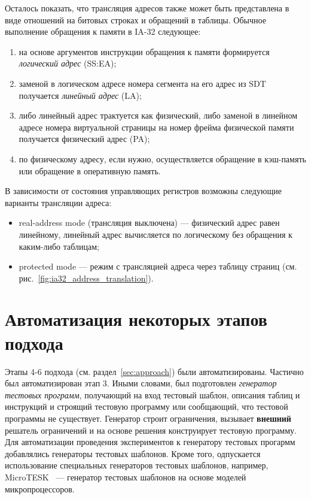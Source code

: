 Осталось показать, что трансляция адресов также может быть представлена в виде
отношений на битовых строках и обращений в таблицы. Обычное выполнение
обращения к памяти в IA-32 следующее:
\begin{enumerate}
    \item на основе аргументов инструкции обращения к памяти формируется \emph{логический адрес} (SS:EA);
    \item заменой в логическом адресе номера сегмента на его адрес из SDT получается \emph{линейный адрес} (LA);
    \item либо линейный адрес трактуется как физический, либо заменой в линейном адресе номера виртуальной страницы на номер фрейма физической памяти получается физический адрес (PA);
    \item по физическому адресу, если нужно, осуществляется обращение в кэш-память или обращение в оперативную память.
\end{enumerate}

В зависимости от состояния управляющих регистров возможны следующие варианты трансляции адреса:
\begin{itemize}
  \item real-address mode (трансляция выключена) --- физический адрес равен линейному, линейный адрес вычисляется по логическому без обращения к каким-либо таблицам;
  \item protected mode --- режим с трансляцией адреса через таблицу страниц (см. рис.~\ref{fig:ia32_address_translation}).
\end{itemize}



\section{Автоматизация некоторых этапов подхода}

Этапы 4-6 подхода (см. раздел~\ref{sec:approach}) были автоматизированы. Частично был автоматизирован этап 3. Иными словами, был подготовлен \emph{генератор тестовых программ}, получающий на вход тестовый шаблон, описания таблиц и инструкций и строящий тестовую программу или сообщающий, что тестовой программы не существует. Генератор строит ограничения, вызывает \textbf{внешний} решатель ограничений и на основе решения конструирует тестовую программу. Для автоматизации проведения экспериментов к генератору тестовых прогармм добавлялись генераторы тестовых шаблонов. Кроме того, одпускается использование специальных генераторов тестовых шаблонов, например, MicroTESK~\cite{MicroTESK} --- генератор тестовых шаблонов на основе моделей микропроцессоров.

